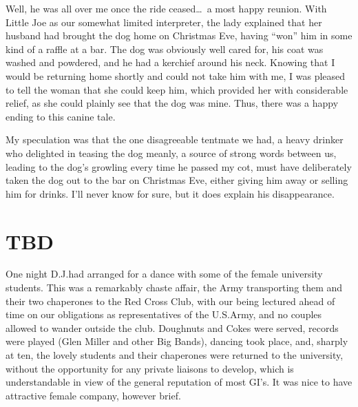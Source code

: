 \documentclass[../m3y]{subfiles}
\begin{document}
Well, he was all over me once the ride ceased\ldots\ a most happy reunion. With Little Joe as our somewhat limited interpreter, the lady explained that her husband had brought the dog home on Christmas Eve, having ``won'' him in some kind of a raffle at a bar. The dog was obviously well cared for, his coat was washed and powdered, and he had a kerchief around his neck. Knowing that I would be returning home shortly and could not take him with me, I was pleased to tell the woman that she could keep him, which provided her with considerable relief, as she could plainly see that the dog was mine. Thus, there was a happy ending to this canine tale.

My speculation was that the one disagreeable tentmate we had, a heavy drinker who delighted in teasing the dog meanly, a source of strong words between us, leading to the dog's growling every time he passed my cot, must have deliberately taken the dog out to the bar on Christmas Eve, either giving him away or selling him for drinks. I'll never know for sure, but it does explain his disappearance.

\section{TBD}
One night D.J.\@ had arranged for a dance with some of the female university students. This was a remarkably chaste affair, the Army transporting them and their two chaperones to the Red Cross Club, with our being lectured ahead of time on our obligations as representatives of the U.S.\@ Army, and no couples allowed to wander outside the club. Doughnuts and Cokes were served, records were played (Glen Miller and other Big Bands), dancing took place, and, sharply at ten, the lovely students and their chaperones were returned to the university, without the opportunity for any private liaisons to develop, which is understandable in view of the general reputation of most GI's. It was nice to have attractive female company, however brief.
\end{document}
